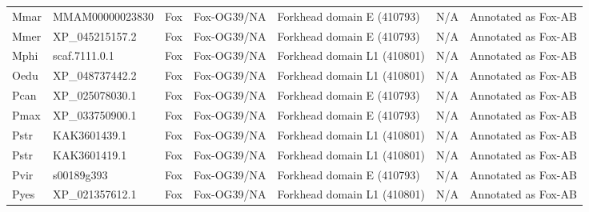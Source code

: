 \documentclass[../main.tex]{subfiles}
\begin{document}
\begin{landscape}
\begin{longtable}{lllllll}
		Mmar           & MMAM00000023830       & Fox            & Fox-OG39/NA         & Forkhead domain E (410793)                  & N/A                                                                    & Annotated as Fox-AB  \\
		Mmer           & XP\_045215157.2       & Fox            & Fox-OG39/NA         & Forkhead domain E (410793)                  & N/A                                                                    & Annotated as Fox-AB  \\
		Mphi           & scaf.7111.0.1         & Fox            & Fox-OG39/NA         & Forkhead domain L1 (410801)                 & N/A                                                                    & Annotated as Fox-AB  \\
		Oedu           & XP\_048737442.2       & Fox            & Fox-OG39/NA         & Forkhead domain L1 (410801)                 & N/A                                                                    & Annotated as Fox-AB  \\
		Pcan           & XP\_025078030.1       & Fox            & Fox-OG39/NA         & Forkhead domain E (410793)                  & N/A                                                                    & Annotated as Fox-AB  \\
		Pmax           & XP\_033750900.1       & Fox            & Fox-OG39/NA         & Forkhead domain E (410793)                  & N/A                                                                    & Annotated as Fox-AB  \\
		Pstr           & KAK3601439.1          & Fox            & Fox-OG39/NA         & Forkhead domain L1 (410801)                 & N/A                                                                    & Annotated as Fox-AB  \\
		Pstr           & KAK3601419.1          & Fox            & Fox-OG39/NA         & Forkhead domain L1 (410801)                 & N/A                                                                    & Annotated as Fox-AB  \\
		Pvir           & s00189g393            & Fox            & Fox-OG39/NA         & Forkhead domain E (410793)                  & N/A                                                                    & Annotated as Fox-AB  \\
		Pyes           & XP\_021357612.1       & Fox            & Fox-OG39/NA         & Forkhead domain L1 (410801)                 & N/A                                                                    & Annotated as Fox-AB  \\

\end{longtable}
\end{landscape}
\end{document}
